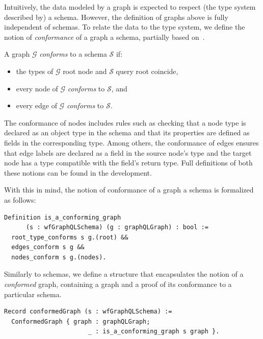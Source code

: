 Intuitively, the data modeled by a \gql graph is expected to respect
(the type system described by) a schema. However, the definition of
graphs above is fully independent of schemas. To relate the data to the type system, we define the notion of \textit{conformance} of a graph \wrt a schema, partially based on~\cite{gqlph}.
%
\begin{definition}
A \gql graph $\mathcal{G}$ \textit{conforms} to a schema $\mathcal{S}$ if:
\begin{itemize}
    \item the types of $\mathcal{G}$ root node and $\mathcal{S}$ query
      root coincide,
    \item every node of $\mathcal{G}$ \textit{conforms} to
      $\mathcal{S}$, and
    \item every edge of $\mathcal{G}$ \textit{conforms} to
      $\mathcal{S}$. 
   
\end{itemize}
\end{definition}
%


The conformance of nodes includes rules such as checking that a node
type is declared as an object type in the schema and that its
properties are defined as fields in the corresponding type. Among
others, the conformance of edges ensures that edge labels are declared
as a field in the source node's type and the target node has a type
compatible with the field's return type. Full definitions of both
these notions can be found in the \coq development. %

With this in mind, the notion of conformance of a graph \wrt a schema is formalized as follows:
%
\begin{verbatim}
Definition is_a_conforming_graph 
      (s : wfGraphQLSchema) (g : graphQLGraph) : bool :=
  root_type_conforms s g.(root) &&
  edges_conform s g &&
  nodes_conform s g.(nodes).
\end{verbatim}
%

Similarly to \gql schemas, we define a structure that encapsulates the notion of a \textit{conformed} graph, containing a graph and a proof of its conformance to a particular schema.

\begin{verbatim}
Record conformedGraph (s : wfGraphQLSchema) :=
  ConformedGraph { graph : graphQLGraph;
                       _ : is_a_conforming_graph s graph }.
\end{verbatim}

